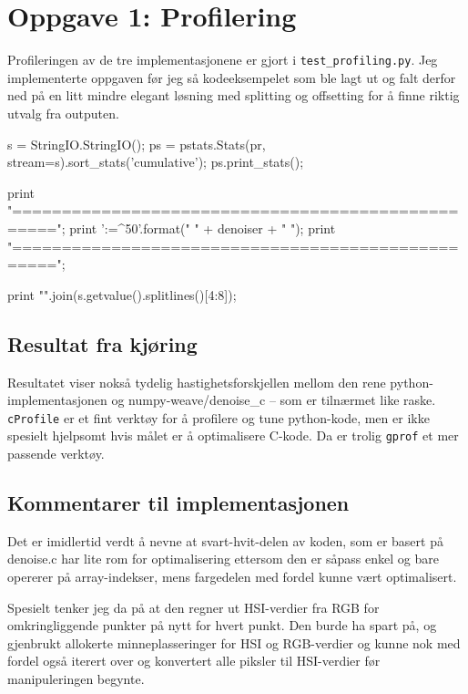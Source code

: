 \section*{Oppgave 1: Profilering}

Profileringen av de tre implementasjonene er gjort i \verb;test_profiling.py;. Jeg implementerte oppgaven før jeg så kodeeksempelet som ble lagt ut og falt derfor ned på en litt mindre elegant løsning med splitting og offsetting for å finne riktig utvalg fra outputen.

s = StringIO.StringIO();
ps = pstats.Stats(pr, stream=s).sort_stats('cumulative');
ps.print_stats();

print "\n\n==================================================";
print '{:=^50}'.format(" " + denoiser + " ");
print "==================================================";

print "\n".join(s.getvalue().splitlines()[4:8]);

\subsection*{Resultat fra kjøring}

Resultatet viser nokså tydelig hastighetsforskjellen mellom den rene python-implementasjonen og numpy-weave/denoise\_c – som er tilnærmet like raske. \verb;cProfile; er et fint verktøy for å profilere og tune python-kode, men er ikke spesielt hjelpsomt hvis målet er å optimalisere C-kode. Da er trolig \verb;gprof; et mer passende verktøy.

\subsection*{Kommentarer til implementasjonen}
Det er imidlertid verdt å nevne at svart-hvit-delen av koden, som er basert på denoise.c har lite rom for optimalisering ettersom den er såpass enkel og bare opererer på array-indekser, mens fargedelen med fordel kunne vært optimalisert.

Spesielt tenker jeg da på at den regner ut HSI-verdier fra RGB for omkringliggende punkter på nytt for hvert punkt. Den burde ha spart på, og gjenbrukt allokerte minneplasseringer for HSI og RGB-verdier og kunne nok med fordel også iterert over og konvertert alle piksler til HSI-verdier før manipuleringen begynte.